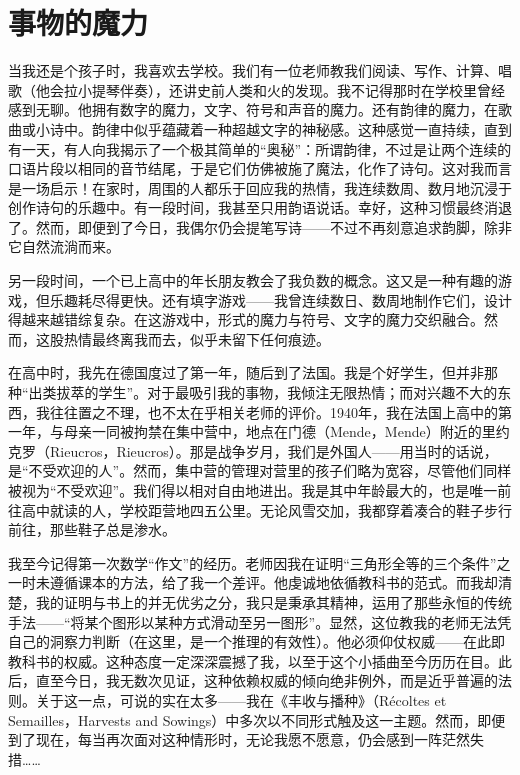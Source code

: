 \section{事物的魔力}

当我还是个孩子时，我喜欢去学校。我们有一位老师教我们阅读、写作、计算、唱歌（他会拉小提琴伴奏），还讲史前人类和火的发现。我不记得那时在学校里曾经感到无聊。他拥有数字的魔力，文字、符号和声音的魔力。还有韵律的魔力，在歌曲或小诗中。韵律中似乎蕴藏着一种超越文字的神秘感。这种感觉一直持续，直到有一天，有人向我揭示了一个极其简单的“奥秘”：所谓韵律，不过是让两个连续的口语片段以相同的音节结尾，于是它们仿佛被施了魔法，化作了诗句。这对我而言是一场启示！在家时，周围的人都乐于回应我的热情，我连续数周、数月地沉浸于创作诗句的乐趣中。有一段时间，我甚至只用韵语说话。幸好，这种习惯最终消退了。然而，即便到了今日，我偶尔仍会提笔写诗——不过不再刻意追求韵脚，除非它自然流淌而来。

另一段时间，一个已上高中的年长朋友教会了我负数的概念。这又是一种有趣的游戏，但乐趣耗尽得更快。还有填字游戏——我曾连续数日、数周地制作它们，设计得越来越错综复杂。在这游戏中，形式的魔力与符号、文字的魔力交织融合。然而，这股热情最终离我而去，似乎未留下任何痕迹。

在高中时，我先在德国度过了第一年，随后到了法国。我是个好学生，但并非那种“出类拔萃的学生”。对于最吸引我的事物，我倾注无限热情；而对兴趣不大的东西，我往往置之不理，也不太在乎相关老师的评价。1940年，我在法国上高中的第一年，与母亲一同被拘禁在集中营中，地点在门德（Mende，Mende）附近的里约克罗（Rieucros，Rieucros）。那是战争岁月，我们是外国人——用当时的话说，是“不受欢迎的人”。然而，集中营的管理对营里的孩子们略为宽容，尽管他们同样被视为“不受欢迎”。我们得以相对自由地进出。我是其中年龄最大的，也是唯一前往高中就读的人，学校距营地四五公里。无论风雪交加，我都穿着凑合的鞋子步行前往，那些鞋子总是渗水。

我至今记得第一次数学“作文”的经历。老师因我在证明“三角形全等的三个条件”之一时未遵循课本的方法，给了我一个差评。他虔诚地依循教科书的范式。而我却清楚，我的证明与书上的并无优劣之分，我只是秉承其精神，运用了那些永恒的传统手法——“将某个图形以某种方式滑动至另一图形”。显然，这位教我的老师无法凭自己的洞察力判断（在这里，是一个推理的有效性）。他必须仰仗权威——在此即教科书的权威。这种态度一定深深震撼了我，以至于这个小插曲至今历历在目。此后，直至今日，我无数次见证，这种依赖权威的倾向绝非例外，而是近乎普遍的法则。关于这一点，可说的实在太多——我在《丰收与播种》（Récoltes et Semailles，Harvests and Sowings）中多次以不同形式触及这一主题。然而，即便到了现在，每当再次面对这种情形时，无论我愿不愿意，仍会感到一阵茫然失措……


